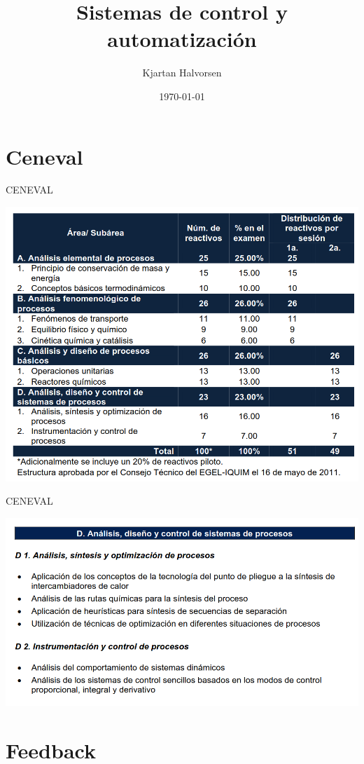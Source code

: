 \documentclass[presentation,aspectratio=169, usenames, dvipsnames]{beamer}
\author{Kjartan Halvorsen}
\date{\today}
\title{Sistemas de control y automatización}
\begin{document}
\maketitle

\section{Ceneval}
\label{sec:org9507565}

\begin{frame}[label={sec:org396b593}]{CENEVAL}
\begin{center}
  \includegraphics[width=.7\linewidth]{./subareas.png}
\end{center}
\end{frame}

\begin{frame}[label={sec:org4e6e0e8}]{CENEVAL}
\begin{center}
  \includegraphics[width=.7\linewidth]{./seccion-D.png}
\end{center}
\end{frame}


\section{Feedback}
\label{sec:org46ff7e9}
\end{document}
